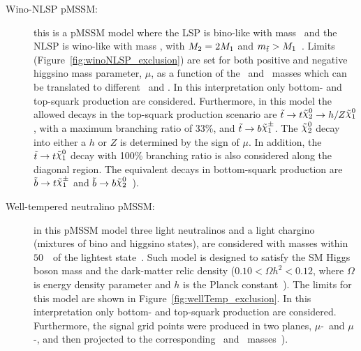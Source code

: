 \begin{description}
				\item[\boldmath Wino-NLSP pMSSM:] this is a \ac{pMSSM} model where the \ac{LSP} is bino-like with mass \mone\ and the \ac{NLSP} is wino-like with mass \mtwo, with $M_{2}=2M_{1}$ and $m_{\tilde{t}}>M_{1}$~\cite{Papucci2011}. Limits (Figure~\ref{fig:winoNLSP_exclusion}) are set for both positive and negative higgsino mass parameter, $\mu$, as a function of the \stop\ and \ninoone\ masses which can be translated to different \mone\ and \mqlthree. In this interpretation only bottom- and top-squark production are considered. Furthermore, in this model the allowed decays in the top-squark production scenario are $\stop\to t \ninotwo\to h/Z \LSP$, with a maximum branching ratio of 33\%, and $\stop \to b \chinoonepm$. The $\ninotwo$ decay into either a $h$ or $Z$ is determined by the sign of $\mu$. In addition, the $\stop\to t\LSP$ decay with 100\% branching ratio is also considered along the diagonal region. The equivalent decays in bottom-squark production are $\sbottom\to t\chinoonepm$ and $\sbottom\to b\ninotwo$~\cite{stop0L}). %

				\item[\boldmath Well-tempered neutralino pMSSM:] in this \ac{pMSSM} model three light neutralinos and a light chargino (mixtures of bino and higgsino states), are considered with masses within $50$~\GeV\ of the lightest state~\cite{atlasDM,wellTemp}. Such model is designed to satisfy the \ac{SM} Higgs boson mass and the dark-matter relic density ($0.10<\Omega h^{2}<0.12$, where $\Omega$ is energy density parameter and $h$ is the Planck constant~\cite{relic_density}).
				The limits for this model are shown in Figure~\ref{fig:wellTemp_exclusion}. In this interpretation only bottom- and top-squark production are considered. Furthermore, the signal grid points were produced in two planes, $\mu$-\mtr\ and $\mu$-\mqlthree, and then projected to the corresponding \stop\ and \ninoone\ masses~\cite{stop0L}).%
			\end{description}

